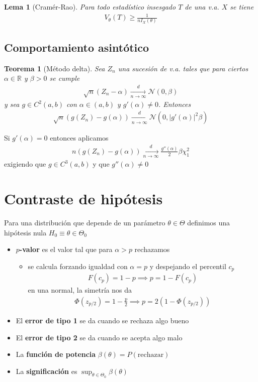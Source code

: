\documentclass[a4paper,twocolumn]{extarticle}
\newtheorem*{thm}{Teorema}
\newtheorem*{lem}{Lema}
\theoremstyle{remark}
\newcommand{\R}{\mathbb{R}}
\newcommand{\normal}{\mathcal{N}}
\begin{document}
\begin{lem}[Cramér-Rao]
	Para todo estadístico insesgado $T$ de una v.a. $X$ se tiene
	\begin{align*}
		V_\theta(T) \geq \frac{1}{nI_X(\theta)}
	\end{align*}
\end{lem}

\subsection{Comportamiento asintótico}

\begin{thm}[Método delta]
	Sea $Z_n$ una sucesión de v.a. tales que para ciertos $\alpha \in \R$ y  $\beta > 0$ se cumple
	\begin{align*}
		\sqrt{n}(Z_n - \alpha)\xrightarrow[n \to \infty]{d} \normal(0, \beta)
	\end{align*}
	y sea $g \in C^2(a,b)$ con $\alpha \in (a,b)$ y $g'(\alpha) \neq 0$. Entonces
	\begin{align*}
		\sqrt{n}(g(Z_n) - g(\alpha)) \xrightarrow[n \to \infty]{d} \normal(0, |g'(\alpha)|^2\beta)
	\end{align*}
\end{thm}

Si $g'(\alpha) = 0$ entonces aplicamos
\begin{align*}
	n(g(Z_n) - g(\alpha)) \xrightarrow[n \to \infty]{d} \frac{g''(\alpha)}{2}\beta \chi_1^2
\end{align*}
exigiendo que $g \in C^3(a,b)$ y que $g''(\alpha) \neq 0$

\section{Contraste de hipótesis}

Para una distribución que depende de un parámetro $\theta \in \Theta$ definimos una hipótesis nula $H_0 \equiv \theta \in \Theta_0$

\begin{itemize}
	\item $p$\textbf{-valor} es el valor tal que para $\alpha > p$ rechazamos
	\begin{itemize}
		\item se calcula forzando igualdad con $\alpha = p$ y despejando el percentil $c_p$
		\begin{align*}
		F(c_p) = 1 - p \implies p = 1 - F(c_p)
		\end{align*}
		en una normal, la simetría nos da
		\begin{align*}
			\Phi(z_{p/2}) = 1 - \frac{p}{2} \implies p = 2(1 - \Phi(z_{p/2}))
		\end{align*}
	\end{itemize}
	\item El \textbf{error de tipo 1} se da cuando se rechaza algo bueno
	\item El \textbf{error de tipo 2} se da cuando se acepta algo malo
	\item La \textbf{función de potencia} $\beta(\theta) = P(\text{rechazar})$
	\item La \textbf{significación} es $\sup_{\theta \in \Theta_0} \beta(\theta)$
\end{itemize}
\end{document}
